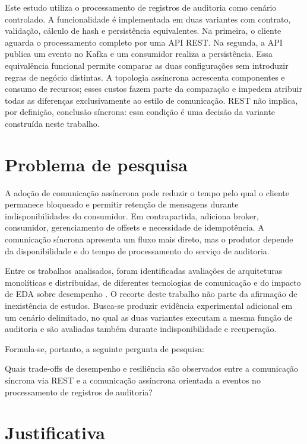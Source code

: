 Este estudo utiliza o processamento de registros de auditoria como cenário controlado. A funcionalidade é implementada em duas variantes com contrato, validação, cálculo de hash e persistência equivalentes. Na primeira, o cliente aguarda o processamento completo por uma API REST. Na segunda, a API publica um evento no Kafka e um consumidor realiza a persistência. Essa equivalência funcional permite comparar as duas configurações sem introduzir regras de negócio distintas. A topologia assíncrona acrescenta componentes e consumo de recursos; esses custos fazem parte da comparação e impedem atribuir todas as diferenças exclusivamente ao estilo de comunicação. REST não implica, por definição, conclusão síncrona: essa condição é uma decisão da variante construída neste trabalho.

\section{Problema de pesquisa}

A adoção de comunicação assíncrona pode reduzir o tempo pelo qual o cliente permanece bloqueado e permitir retenção de mensagens durante indisponibilidades do consumidor. Em contrapartida, adiciona broker, consumidor, gerenciamento de offsets e necessidade de idempotência. A comunicação síncrona apresenta um fluxo mais direto, mas o produtor depende da disponibilidade e do tempo de processamento do serviço de auditoria.

Entre os trabalhos analisados, foram identificadas avaliações de arquiteturas monolíticas e distribuídas, de diferentes tecnologias de comunicação e do impacto de EDA sobre desempenho \cite{blinowski2022,cabane2024,kazanavicius2023}. O recorte deste trabalho não parte da afirmação de inexistência de estudos. Busca-se produzir evidência experimental adicional em um cenário delimitado, no qual as duas variantes executam a mesma função de auditoria e são avaliadas também durante indisponibilidade e recuperação.

Formula-se, portanto, a seguinte pergunta de pesquisa:

\begin{citacao}
Quais trade-offs de desempenho e resiliência são observados entre a comunicação síncrona via REST e a comunicação assíncrona orientada a eventos no processamento de registros de auditoria?
\end{citacao}

\section{Justificativa}

